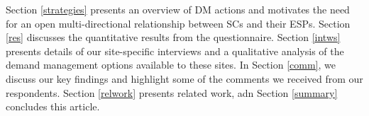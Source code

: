 Section \ref{strategies} presents an overview of DM actions and motivates the need for an open multi-directional relationship between SCs and their ESPs. Section \ref{res} discusses the quantitative results from the questionnaire. Section \ref{intws} presents details of our site-specific interviews and a qualitative analysis of the demand management options available to these sites. In Section \ref{comm}, we discuss our key findings and highlight some of the comments we received from our respondents. Section \ref{relwork} presents related work, adn Section \ref{summary} concludes this article.
